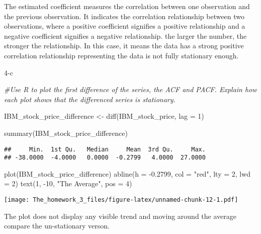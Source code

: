 \documentclass[
]{article}
\newenvironment{Shaded}{\begin{snugshade}}{\end{snugshade}}
\newcommand{\AttributeTok}[1]{\textcolor[rgb]{0.77,0.63,0.00}{#1}}
\newcommand{\CommentTok}[1]{\textcolor[rgb]{0.56,0.35,0.01}{\textit{#1}}}
\newcommand{\DecValTok}[1]{\textcolor[rgb]{0.00,0.00,0.81}{#1}}
\newcommand{\FloatTok}[1]{\textcolor[rgb]{0.00,0.00,0.81}{#1}}
\newcommand{\FunctionTok}[1]{\textcolor[rgb]{0.00,0.00,0.00}{#1}}
\newcommand{\NormalTok}[1]{#1}
\newcommand{\OtherTok}[1]{\textcolor[rgb]{0.56,0.35,0.01}{#1}}
\newcommand{\SpecialCharTok}[1]{\textcolor[rgb]{0.00,0.00,0.00}{#1}}
\newcommand{\StringTok}[1]{\textcolor[rgb]{0.31,0.60,0.02}{#1}}
\begin{document}
The estimated coefficient measures the correlation between one
observation and the previous observation. It indicates the correlation
relationship between two observations, where a positive coefficient
signifies a positive relationship and a negative coefficient signifies a
negative relationship. the larger the number, the stronger the
relationship. In this case, it means the data has a strong positive
correlation relationship representing the data is not fully stationary
enough.

4-c

\begin{Shaded}
\begin{Highlighting}[]
\CommentTok{\#Use R to plot the ﬁrst diﬀerence of the series, the ACF and PACF. Explain how each plot shows that the diﬀerenced series is stationary.}

\NormalTok{IBM\_stock\_price\_difference }\OtherTok{\textless{}{-}} \FunctionTok{diff}\NormalTok{(IBM\_stock\_price, }\AttributeTok{lag =} \DecValTok{1}\NormalTok{)}

\FunctionTok{summary}\NormalTok{(IBM\_stock\_price\_difference)}
\end{Highlighting}
\end{Shaded}

\begin{verbatim}
##     Min.  1st Qu.   Median     Mean  3rd Qu.     Max. 
## -38.0000  -4.0000   0.0000  -0.2799   4.0000  27.0000
\end{verbatim}

\begin{Shaded}
\begin{Highlighting}[]
\FunctionTok{plot}\NormalTok{(IBM\_stock\_price\_difference)}
\FunctionTok{abline}\NormalTok{(}\AttributeTok{h =} \SpecialCharTok{{-}}\FloatTok{0.2799}\NormalTok{, }\AttributeTok{col =} \StringTok{"red"}\NormalTok{, }\AttributeTok{lty =} \DecValTok{2}\NormalTok{, }\AttributeTok{lwd =} \DecValTok{2}\NormalTok{)}
\FunctionTok{text}\NormalTok{(}\DecValTok{1}\NormalTok{, }\SpecialCharTok{{-}}\DecValTok{10}\NormalTok{, }\StringTok{"The Average"}\NormalTok{, }\AttributeTok{pos =} \DecValTok{4}\NormalTok{)}
\end{Highlighting}
\end{Shaded}

\texttt{[image: The\_homework\_3\_files/figure-latex/unnamed-chunk-12-1.pdf]}

The plot does not display any visible trend and moving around the
average compare the un-stationary verson.
\end{document}
